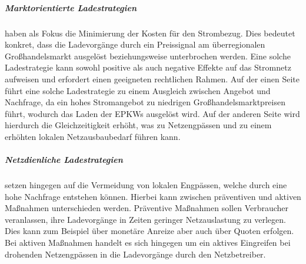 \subparagraph{Marktorientierte Ladestrategien} haben als Fokus die Minimierung der Kosten für den Strombezug. Dies bedeutet konkret, dass die Ladevorgänge durch ein Preissignal am überregionalen Großhandelsmarkt ausgelöst beziehungsweise unterbrochen werden.
Eine solche Ladestrategie kann sowohl positive als auch negative Effekte auf das Stromnetz aufweisen und erfordert einen geeigneten rechtlichen Rahmen.
Auf der einen Seite führt eine solche Ladestrategie zu einem Ausgleich zwischen Angebot und Nachfrage, da ein hohes Stromangebot zu niedrigen Großhandelsmarktpreisen führt, wodurch das Laden der \glspl{EPKW} ausgelöst wird.
Auf der anderen Seite wird hierdurch die Gleichzeitigkeit erhöht, was zu Netzengpässen und zu einem erhöhten lokalen Netzausbaubedarf führen kann. \cite{Agora2019} \cite{Dorendorf2019} \cite{Rehtanz2017}


\subparagraph{Netzdienliche Ladestrategien} setzen hingegen auf die Vermeidung von lokalen Engpässen, welche durch eine hohe Nachfrage entstehen können.
Hierbei kann zwischen präventiven und aktiven Maßnahmen unterschieden werden.
Präventive Maßnahmen sollen Verbraucher veranlassen, ihre Ladevorgänge in Zeiten geringer Netzauslastung zu verlegen.
Dies kann zum Beispiel über monetäre Anreize aber auch über Quoten erfolgen.
Bei aktiven Maßnahmen handelt es sich hingegen um ein aktives Eingreifen bei drohenden Netzengpässen in die Ladevorgänge durch den Netzbetreiber. \cite{Agora2019}

